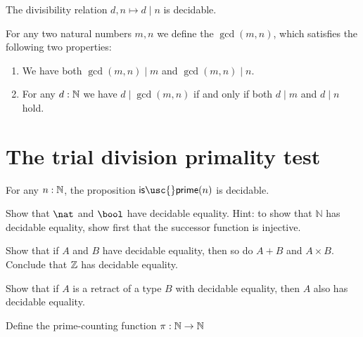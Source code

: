 \begin{lem}
  The divisibility relation $d,n\mapsto d\mid n$ is decidable.
\end{lem}

\begin{defn}
  For any two natural numbers $m,n$ we define the  $\gcd(m,n)$, which satisfies the following two properties:
  \begin{enumerate}
  \item We have both $\gcd(m,n)\mid m$ and $\gcd(m,n)\mid n$.
  \item For any $d:\mathbb{N}$ we have $d\mid \gcd(m,n)$ if and only if both $d\mid m$ and $d\mid n$ hold.
  \end{enumerate}
\end{defn}

\section{The trial division primality test}

\begin{thm}
  For any $n:\mathbb{N}$, the proposition $\mathsf{is\usc{}prime}(n)$ is decidable.
\end{thm}


\begin{exercises}
\item
  \begin{subexenum}
  \item Show that $\nat$ and $\bool$ have decidable equality. Hint: to show that $\mathbb{N}$ has decidable equality, show first that the successor function is injective.
  \item Show that if $A$ and $B$ have decidable equality, then so do $A+B$ and $A\times B$. Conclude that $\mathbb{Z}$ has decidable equality.
  \item Show that if $A$ is a retract of a type $B$ with decidable equality, then $A$ also has decidable equality.
  \end{subexenum}
\item Define the prime-counting function $\pi:\mathbb{N}\to\mathbb{N}$
\end{exercises}
